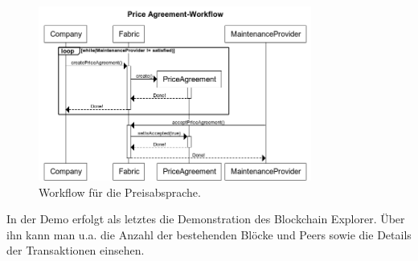 \begin{figure}[!htbp]
    \centering
      \includegraphics[width=0.8\textwidth,angle=0]{images/priceagreement-workflow}
       \caption{Workflow für die Preisabsprache.}
      \label{fig:priceagreement-workflow}
\end{figure}

In der Demo erfolgt als letztes die Demonstration des Blockchain Explorer. Über ihn kann man u.a. die Anzahl der bestehenden Blöcke und Peers sowie die Details der Transaktionen einsehen.